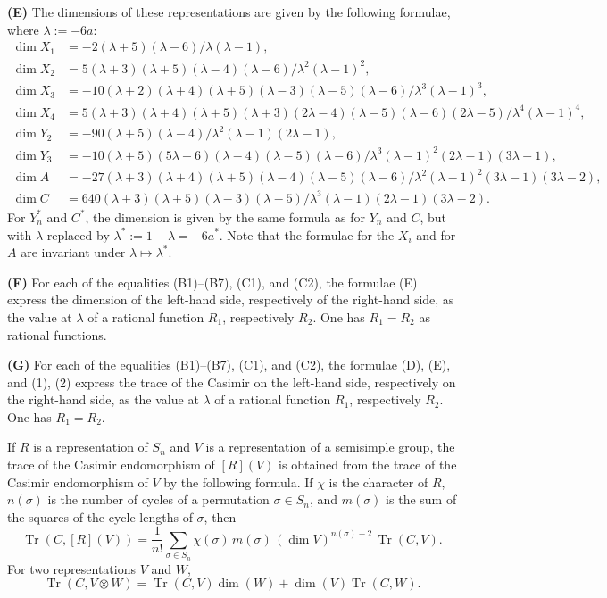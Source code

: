 \documentclass[11pt,a4paper]{article}
\DeclareMathOperator{\Tr}{Tr}
\begin{document}
\medskip
\noindent\textbf{(E)} The dimensions of these representations are given by the following formulae, where $\lambda:=-6a$:
\begin{align*}
\dim X_1&=-2(\lambda+5)(\lambda-6)/\lambda(\lambda-1),\\
\dim X_2&=5(\lambda+3)(\lambda+5)(\lambda-4)(\lambda-6)/\lambda^2(\lambda-1)^2,\\
\dim X_3&=-10(\lambda+2)(\lambda+4)(\lambda+5)(\lambda-3)(\lambda-5)(\lambda-6)/\lambda^3(\lambda-1)^3,\\
\dim X_4&=5(\lambda+3)(\lambda+4)(\lambda+5)(\lambda+3)(2\lambda-4)(\lambda-5)(\lambda-6)(2\lambda-5)/\lambda^4(\lambda-1)^4,\\
\dim Y_2&=-90(\lambda+5)(\lambda-4)/\lambda^2(\lambda-1)(2\lambda-1),\\
\dim Y_3&=-10(\lambda+5)(5\lambda-6)(\lambda-4)(\lambda-5)(\lambda-6)/\lambda^3(\lambda-1)^2(2\lambda-1)(3\lambda-1),\\
\dim A&=-27(\lambda+3)(\lambda+4)(\lambda+5)(\lambda-4)(\lambda-5)(\lambda-6)/\lambda^2(\lambda-1)^2(3\lambda-1)(3\lambda-2),\\
\dim C&=640(\lambda+3)(\lambda+5)(\lambda-3)(\lambda-5)/\lambda^3(\lambda-1)(2\lambda-1)(3\lambda-2).
\end{align*}
For $Y_n^*$ and $C^*$, the dimension is given by the same formula as for $Y_n$ and $C$, but with $\lambda$ replaced by $\lambda^*:=1-\lambda=-6a^*$. Note that the formulae for the $X_i$ and for $A$ are invariant under $\lambda\mapsto\lambda^*$.

\medskip
\noindent\textbf{(F)} For each of the equalities (B1)--(B7), (C1), and (C2), the formulae (E) express the dimension of the left-hand side, respectively of the right-hand side, as the value at $\lambda$ of a rational function $R_1$, respectively $R_2$. One has $R_1=R_2$ as rational functions.

\medskip
\noindent\textbf{(G)} For each of the equalities (B1)--(B7), (C1), and (C2), the formulae (D), (E), and (1), (2) express the trace of the Casimir on the left-hand side, respectively on the right-hand side, as the value at $\lambda$ of a rational function $R_1$, respectively $R_2$. One has $R_1=R_2$.

\bigskip
If $R$ is a representation of $S_n$ and $V$ is a representation of a semisimple group, the trace of the Casimir endomorphism of $[R](V)$ is obtained from the trace of the Casimir endomorphism of $V$ by the following formula. If $\chi$ is the character of $R$, $n(\sigma)$ is the number of cycles of a permutation $\sigma\in S_n$, and $m(\sigma)$ is the sum of the squares of the cycle lengths of $\sigma$, then
\begin{equation}\label{eq:casimir-trace}
\Tr(C,[R](V))=\frac{1}{n!}\sum_{\sigma\in S_n}\chi(\sigma)\,m(\sigma)\,(\dim V)^{n(\sigma)-2}\,\Tr(C,V).
\end{equation}
For two representations $V$ and $W$,
\begin{equation}\label{eq:casimir-tensor}
\Tr(C,V\otimes W)=\Tr(C,V)\dim(W)+\dim(V)\Tr(C,W).
\end{equation}
\end{document}
